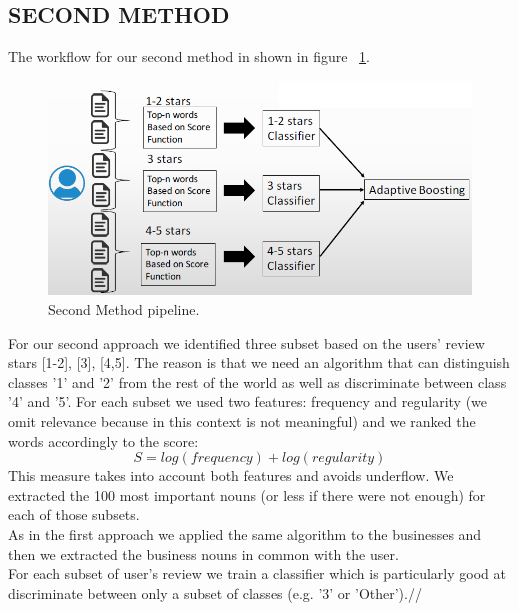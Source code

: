 \documentclass[11pt]{article}
\begin{document}
\subsection{SECOND METHOD}
The workflow for our second method in shown in figure ~\ref{second}.
\begin{figure}[thpb]
	\includegraphics[scale=0.35]{img/secondMethod.png}
	\caption{Second Method pipeline.}
	\label{second}
\end{figure}	
For our second approach we identified three subset based on the users' review stars [1-2], [3], [4,5]. The reason is that we need an algorithm that can distinguish classes '1' and '2' from the rest of the world as well as discriminate between class '4' and '5'. For each subset we used two features: frequency and regularity (we omit relevance because in this context is not meaningful) and we ranked the words accordingly to the score:\[ S=log(frequency)+log(regularity) \]
This measure takes into account both features and avoids underflow.
We extracted the 100 most important nouns (or less if there were not enough) for each of those subsets.\\
As in the first approach we applied the same algorithm to the businesses and then we extracted the business nouns in common with the user.\\
For each subset of user's review we train a classifier which is particularly good at discriminate between only a subset of classes (e.g. '3' or 'Other').//
\end{document}
